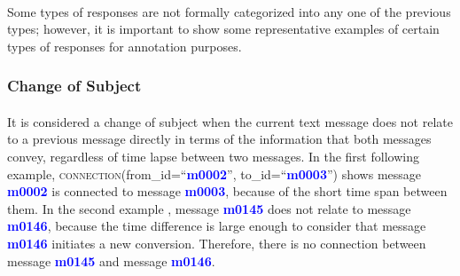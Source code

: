 \documentclass{article}
\begin{document}
\paragraph{}
Some types of responses are not formally categorized into any one of the previous types; however, it is important to show some representative examples of certain types of responses for annotation purposes.

\subsubsection{Change of Subject}
\paragraph{}
It is considered a change of subject when the current text message does not relate to a previous message directly in terms of the information that both messages convey, regardless of time lapse between two messages. In the first following example, \textsc{connection}(from\_id=``\textbf{\textcolor{blue}{m0002}}'', to\_id=``\textbf{\textcolor{blue}{m0003}}'') shows message \textbf{\textcolor{blue}{m0002}} is connected to message \textbf{\textcolor{blue}{m0003}}, because of the short time span between them. In the second example , message \textbf{\textcolor{blue}{m0145}} does not relate to message \textbf{\textcolor{blue}{m0146}}, because the time difference is large enough to consider that message \textbf{\textcolor{blue}{m0146}} initiates a new conversion. Therefore, there is no connection between message \textbf{\textcolor{blue}{m0145}} and message \textbf{\textcolor{blue}{m0146}}.
\end{document}
